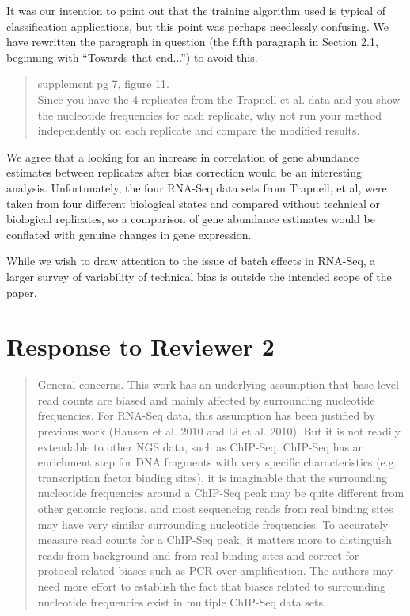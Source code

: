 \documentclass{article}
\begin{document}
It was our intention to point out that the training algorithm used is typical of
classification applications, but this point was perhaps needlessly confusing.
We have rewritten the paragraph in question (the fifth paragraph in Section 2.1,
beginning with ``Towards that end...'') to avoid this.


\begin{quote}
supplement pg 7, figure 11. \\
Since you have the 4 replicates from the Trapnell et al. data and you show the
nucleotide frequencies for each replicate, why not run your method independently
on each replicate and compare the modified results.
\end{quote}

We agree that a looking for an increase in correlation of gene abundance
estimates between replicates after bias correction would be an interesting
analysis. Unfortunately, the four RNA-Seq data sets from Trapnell, et al, were
taken from four different biological states and compared without technical or
biological replicates, so a comparison of gene abundance estimates would be
conflated with genuine changes in gene expression.

While we wish to draw attention to the issue of batch effects in RNA-Seq, a larger
survey of variability of technical bias is outside the intended scope of the
paper.




\section*{Response to Reviewer 2}

\begin{quote}
General concerns. This work has an underlying assumption that base-level read
counts are biased and mainly affected by surrounding nucleotide frequencies.
For RNA-Seq data, this assumption has been justified by previous work (Hansen et
al. 2010 and Li et al. 2010). But it is not readily extendable to other NGS
data, such as ChIP-Seq. ChIP-Seq has an enrichment step for DNA fragments with
very specific characteristics (e.g. transcription factor binding sites), it is
imaginable that the surrounding nucleotide frequencies around a ChIP-Seq peak
may be quite different from other genomic regions, and most sequencing reads
from real binding sites may have very similar surrounding nucleotide
frequencies. To accurately measure read counts for a ChIP-Seq peak, it matters
more to distinguish reads from background and from real binding sites and
correct for protocol-related biases such as PCR over-amplification. The authors
may need more effort to establish the fact that biases related to surrounding
nucleotide frequencies exist in multiple ChIP-Seq data sets.
\end{quote}
\end{document}
